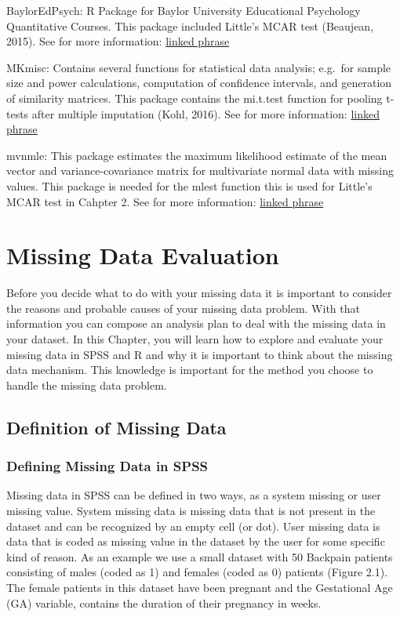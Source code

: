 \documentclass[]{book}
\begin{document}
BaylorEdPsych: R Package for Baylor University Educational Psychology
Quantitative Courses. This package included Little's MCAR test
(Beaujean, 2015). See for more information:
\href{https://cran.r-project.org/web/packages/BaylorEdPsych/index.html}{linked
phrase}

MKmisc: Contains several functions for statistical data analysis;
e.g.~for sample size and power calculations, computation of confidence
intervals, and generation of similarity matrices. This package contains
the mi.t.test function for pooling t-tests after multiple imputation
(Kohl, 2016). See for more information:
\href{https://cran.r-project.org/web/packages/MKmisc/index.html}{linked
phrase}

mvnmle: This package estimates the maximum likelihood estimate of the
mean vector and variance-covariance matrix for multivariate normal data
with missing values. This package is needed for the mlest function this
is used for Little's MCAR test in Cahpter 2. See for more information:
\href{https://cran.r-project.org/web/packages/mvnmle/index.html}{linked
phrase}

\chapter{Missing Data Evaluation}\label{missing-data-evaluation}

Before you decide what to do with your missing data it is important to
consider the reasons and probable causes of your missing data problem.
With that information you can compose an analysis plan to deal with the
missing data in your dataset. In this Chapter, you will learn how to
explore and evaluate your missing data in SPSS and R and why it is
important to think about the missing data mechanism. This knowledge is
important for the method you choose to handle the missing data problem.

\section{Definition of Missing Data}\label{definition-of-missing-data}

\subsection{Defining Missing Data in
SPSS}\label{defining-missing-data-in-spss}

Missing data in SPSS can be defined in two ways, as a system missing or
user missing value. System missing data is missing data that is not
present in the dataset and can be recognized by an empty cell (or dot).
User missing data is data that is coded as missing value in the dataset
by the user for some specific kind of reason. As an example we use a
small dataset with 50 Backpain patients consisting of males (coded as 1)
and females (coded as 0) patients (Figure 2.1). The female patients in
this dataset have been pregnant and the Gestational Age (GA) variable,
contains the duration of their pregnancy in weeks.
\end{document}
